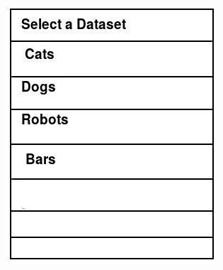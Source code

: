 \documentclass[aspectratio=169]{beamer}
\begin{document}
\begin{frame}
  \begin{columns}[c]
    \begin{column}{0.5\columnwidth}
      \includegraphics[width=\columnwidth]{ss_photohunter_dataset}
    \end{column}
    \begin{column}{0.5\columnwidth}

\end{column}
\end{columns}
\end{frame}
\end{document}
